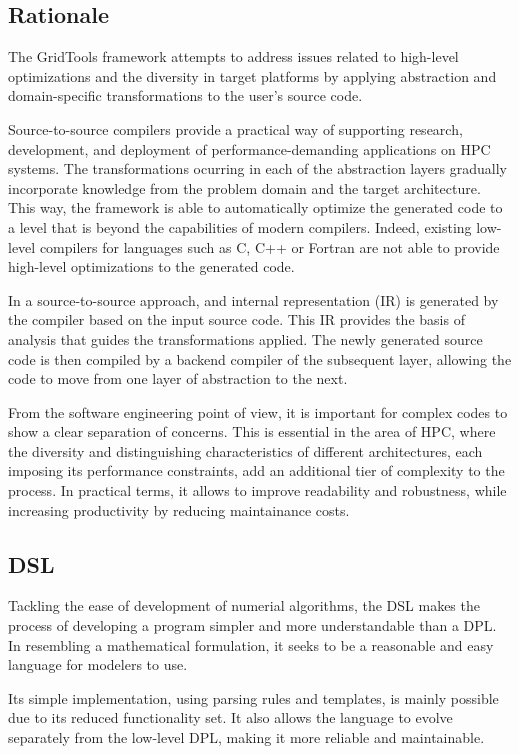 \documentclass[english]{article}
\begin{document}
\subsection*{Rationale}
The GridTools framework attempts to address issues related to high-level optimizations and the diversity in target platforms by applying abstraction and domain-specific transformations to the user's source code.

Source-to-source compilers provide a practical way of supporting research, development, and deployment of performance-demanding applications on HPC systems.
The transformations ocurring in each of the abstraction layers gradually incorporate knowledge from the problem domain and the target architecture.
This way, the framework is able to automatically optimize the generated code to a level that is beyond the capabilities of modern compilers.
Indeed, existing low-level compilers for languages such as C, C++ or Fortran are not able to provide high-level optimizations to the generated code. 

In a source-to-source approach, and internal representation (IR) is generated by the compiler based on the input source code.
This IR provides the basis of analysis that guides the transformations applied.
The newly generated source code is then compiled by a backend compiler of the subsequent layer, allowing the code to move from one layer of abstraction to the next.

From the software engineering point of view, it is important for complex codes to show a clear separation of concerns.
This is essential in the area of HPC, where the diversity and distinguishing characteristics of different architectures, each imposing its performance constraints, add an additional tier of complexity to the process.
In practical terms, it allows to improve readability and robustness, while increasing productivity by reducing maintainance costs.


\subsection{DSL}
Tackling the ease of development of numerial algorithms, the DSL makes the process of developing a program simpler and more understandable than a DPL.
In resembling a mathematical formulation, it seeks to be a reasonable and easy language for modelers to use.

Its simple implementation, using parsing rules and templates, is mainly possible due to its reduced functionality set.
It also allows the language to evolve separately from the low-level DPL, making it more reliable and maintainable.
\end{document}
